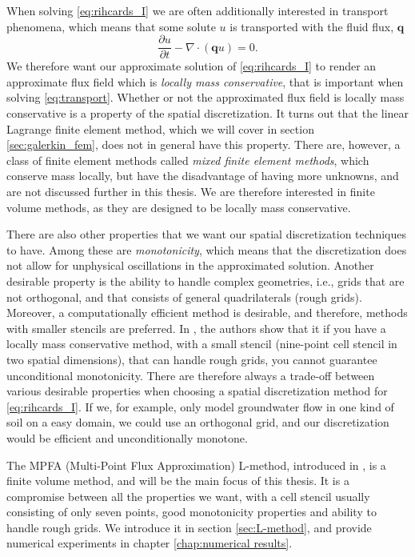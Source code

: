 \documentclass[../Main/main.tex]{subfiles}
\begin{document}
\par 
When solving \eqref{eq:rihcards_I} we are often additionally interested in transport phenomena, which means that some solute $u$ is transported with the fluid flux,  $\bm{q}$
\begin{equation}\label{eq:transport}
	\frac{\partial u}{\partial t} - \nabla \cdot (\bm{q}u) = 0.
\end{equation}
We therefore want our approximate solution of \eqref{eq:rihcards_I} to render an approximate flux field which is \emph{locally mass conservative}, that is important when solving \eqref{eq:transport}. Whether or not the approximated flux field is locally mass conservative is a property of the spatial discretization. It turns out that the linear Lagrange finite element method, which we will cover in section \ref{sec:galerkin_fem}, does not in general have this property. There are, however, a class of finite element methods called \emph{mixed finite element methods}, which conserve mass locally, but have the disadvantage of having more unknowns, and are not discussed further in this thesis. We are therefore interested in finite volume methods, as they are designed to be locally mass conservative.
\par
There are also other properties that we want our spatial discretization techniques to have. Among these are \emph{monotonicity}, which means that the discretization does not allow for unphysical oscillations in the approximated solution. Another desirable property is the ability to handle complex geometries, i.e., grids that are not orthogonal, and that consists of general quadrilaterals (rough grids). Moreover, a computationally efficient method is desirable, and therefore, methods with smaller stencils are preferred. In \cite{10.1007/s00211-006-0060-z}, the authors show that it if you have a locally mass conservative method, with a small stencil (nine-point cell stencil in two spatial dimensions), that can handle rough grids, you cannot guarantee unconditional monotonicity. There are therefore always a trade-off between various desirable properties when choosing a spatial discretization method for \eqref{eq:rihcards_I}. If we, for example, only model groundwater flow in one kind of soil on a easy domain, we could use an orthogonal grid, and our discretization would be efficient and unconditionally monotone.
\par 
The MPFA (Multi-Point Flux Approximation) L-method, introduced in \cite{https://doi.org/10.1002/num.20320}, is a finite volume method, and will be the main focus of this thesis. It is a compromise between all the properties we want, with a cell stencil usually consisting of only seven points, good monotonicity properties and ability to handle rough grids. We introduce it in section \ref{sec:L-method}, and provide numerical experiments in chapter \ref{chap:numerical results}. 
\end{document}
